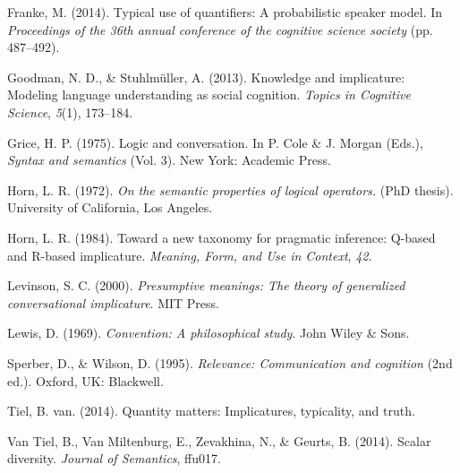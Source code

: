 \documentclass[10pt, letterpaper]{article}
\begin{document}
Franke, M. (2014). Typical use of quantifiers: A probabilistic speaker
model. In \emph{Proceedings of the 36th annual conference of the
cognitive science society} (pp. 487--492).

Goodman, N. D., \& Stuhlm{ü}ller, A. (2013). Knowledge and implicature:
Modeling language understanding as social cognition. \emph{Topics in
Cognitive Science}, \emph{5}(1), 173--184.

Grice, H. P. (1975). Logic and conversation. In P. Cole \& J. Morgan
(Eds.), \emph{Syntax and semantics} (Vol. 3). New York: Academic Press.

Horn, L. R. (1972). \emph{On the semantic properties of logical
operators.} (PhD thesis). University of California, Los Angeles.

Horn, L. R. (1984). Toward a new taxonomy for pragmatic inference:
Q-based and R-based implicature. \emph{Meaning, Form, and Use in
Context}, \emph{42}.

Levinson, S. C. (2000). \emph{Presumptive meanings: The theory of
generalized conversational implicature}. MIT Press.

Lewis, D. (1969). \emph{Convention: A philosophical study}. John Wiley
\& Sons.

Sperber, D., \& Wilson, D. (1995). \emph{Relevance: Communication and
cognition} (2nd ed.). Oxford, UK: Blackwell.

Tiel, B. van. (2014). Quantity matters: Implicatures, typicality, and
truth.

Van Tiel, B., Van Miltenburg, E., Zevakhina, N., \& Geurts, B. (2014).
Scalar diversity. \emph{Journal of Semantics}, ffu017.
\end{document}
